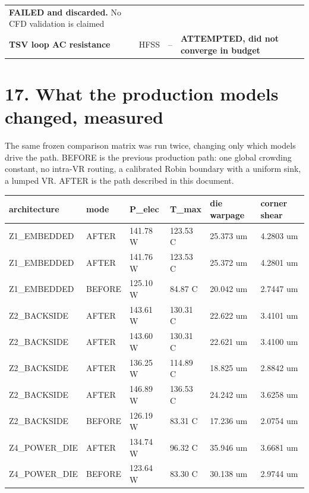 \documentclass[10pt,]{article}
\begin{document}
\begin{longtable}[]{@{}llll@{}}
\begin{minipage}[t]{0.22\columnwidth}
\textbf{FAILED and discarded.} No CFD validation is claimed\strut
\end{minipage}\tabularnewline
\begin{minipage}[t]{0.22\columnwidth}\raggedright
\textbf{TSV loop AC resistance}\strut
\end{minipage} & \begin{minipage}[t]{0.22\columnwidth}\raggedright
HFSS\strut
\end{minipage} & \begin{minipage}[t]{0.22\columnwidth}\raggedright
--\strut
\end{minipage} & \begin{minipage}[t]{0.22\columnwidth}\raggedright
\textbf{ATTEMPTED, did not converge in budget}\strut
\end{minipage}\tabularnewline
\bottomrule
\end{longtable}

\newpage

\hypertarget{what-the-production-models-changed-measured}{%
\section{17. What the production models changed,
measured}\label{what-the-production-models-changed-measured}}

The same frozen comparison matrix was run twice, changing only which
models drive the path. BEFORE is the previous production path: one
global crowding constant, no intra-VR routing, a calibrated Robin
boundary with a uniform sink, a lumped VR. AFTER is the path described
in this document.

\begin{longtable}[]{@{}llllll@{}}
\toprule
architecture & mode & P\_elec & T\_max & die warpage & corner
shear\tabularnewline
\midrule
\endhead
Z1\_EMBEDDED & AFTER & 141.78 W & 123.53 C & 25.373 um & 4.2803
um\tabularnewline
Z1\_EMBEDDED & AFTER & 141.76 W & 123.53 C & 25.372 um & 4.2801
um\tabularnewline
Z1\_EMBEDDED & BEFORE & 125.10 W & 84.87 C & 20.042 um & 2.7447
um\tabularnewline
Z2\_BACKSIDE & AFTER & 143.61 W & 130.31 C & 22.622 um & 3.4101
um\tabularnewline
Z2\_BACKSIDE & AFTER & 143.60 W & 130.31 C & 22.621 um & 3.4100
um\tabularnewline
Z2\_BACKSIDE & AFTER & 136.25 W & 114.89 C & 18.825 um & 2.8842
um\tabularnewline
Z2\_BACKSIDE & AFTER & 146.89 W & 136.53 C & 24.242 um & 3.6258
um\tabularnewline
Z2\_BACKSIDE & BEFORE & 126.19 W & 83.31 C & 17.236 um & 2.0754
um\tabularnewline
Z4\_POWER\_DIE & AFTER & 134.74 W & 96.32 C & 35.946 um & 3.6681
um\tabularnewline
Z4\_POWER\_DIE & BEFORE & 123.64 W & 83.30 C & 30.138 um & 2.9744
um\tabularnewline
\bottomrule
\end{longtable}
\end{document}
